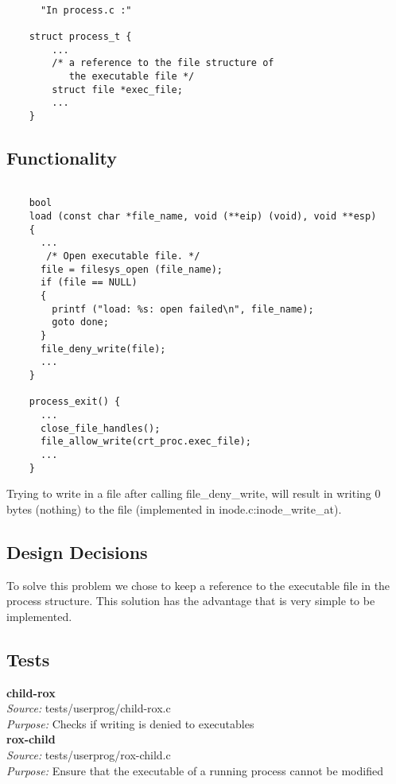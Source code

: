 {    \begin{lstlisting}

      "In process.c :"
	
	struct process_t {
	    ...
	    /* a reference to the file structure of 
	       the executable file */
	    struct file *exec_file;
	    ...
	}

    \end{lstlisting}


    \subsection{Functionality}
   \begin{lstlisting}

	bool
	load (const char *file_name, void (**eip) (void), void **esp) 
	{
	  ...
	   /* Open executable file. */
	  file = filesys_open (file_name);
	  if (file == NULL) 
	  {
	    printf ("load: %s: open failed\n", file_name);
	    goto done; 
	  }
	  file_deny_write(file);
	  ...
	}

	process_exit() {
	  ...
	  close_file_handles();
	  file_allow_write(crt_proc.exec_file);
	  ...
	}	
    \end{lstlisting}

    Trying to write in a file after calling file\_deny\_write, will result in writing 0 bytes (nothing) to the file (implemented in inode.c:inode\_write\_at).

    \subsection{Design Decisions}

	To solve this problem we chose to keep a reference to the executable file in the process structure. This solution has the advantage that is very simple to be implemented.

    \subsection{Tests}

    \textbf{child-rox}\\
    \textit{Source:} tests/userprog/child-rox.c\\
    \textit{Purpose:} Checks if writing is denied to executables\\

    \textbf{rox-child}\\
    \textit{Source:} tests/userprog/rox-child.c\\
    \textit{Purpose:} Ensure that the executable of a running process cannot be modified\\    

}
